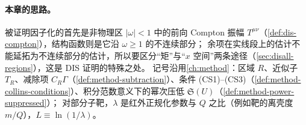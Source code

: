 \paragraph{本章的思路。}
被证明因子化的首先是非物理区 $|\omega|<1$ 中的前向 Compton 振幅 $T^{\mu\nu}$（\cref{def:dis-compton}），结构函数则是它沿 $\omega\ge1$ 的不连续部分；
余项在实线段上的估计不能延拓为不连续部分的估计，所以要区分“矩”与“$x$ 空间”两条途径（\cref{sec:disall-regions}），这是 DIS 证明的特殊之处。
记号沿用\cref{ch:method}：区域 $R$、近似子 $T_R$、减除项 $C_R\Gamma$（\cref{def:method-subtraction}）、条件 (CS1)–(CS3)（\cref{def:method-collins-conditions}）、积分范数意义下的幂次压低 $\mathfrak S(U)$（\cref{def:method-power-suppressed}）；
对部分子靶，$\lambda$ 是红外正规化参数与 $Q$ 之比（例如靶的离壳度 $m/Q$），$L\equiv\ln(1/\lambda)$。
